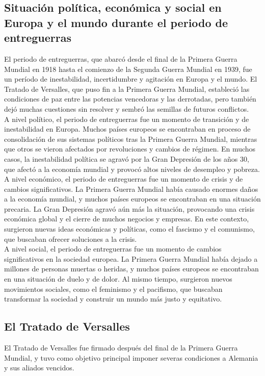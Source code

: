 \documentclass{article}
\theoremstyle{mytheoremstyle}
\theoremstyle{mytheoremstyle}
\theoremstyle{myproblemstyle}
\begin{document}
    \subsection{Situación política, económica y social en Europa y el mundo durante el periodo de entreguerras}
    El periodo de entreguerras, que abarcó desde el final de la Primera Guerra Mundial en 1918 hasta el comienzo de la Segunda Guerra Mundial en 1939, fue un período de inestabilidad, incertidumbre y agitación en Europa y el mundo. El Tratado de Versalles, que puso fin a la Primera Guerra Mundial, estableció las condiciones de paz entre las potencias vencedoras y las derrotadas, pero también dejó muchas cuestiones sin resolver y sembró las semillas de futuros conflictos.\\

    A nivel político, el periodo de entreguerras fue un momento de transición y de inestabilidad en Europa. Muchos países europeos se encontraban en proceso de consolidación de sus sistemas políticos tras la Primera Guerra Mundial, mientras que otros se vieron afectados por revoluciones y cambios de régimen. En muchos casos, la inestabilidad política se agravó por la Gran Depresión de los años 30, que afectó a la economía mundial y provocó altos niveles de desempleo y pobreza.\\

    A nivel económico, el periodo de entreguerras fue un momento de crisis y de cambios significativos. La Primera Guerra Mundial había causado enormes daños a la economía mundial, y muchos países europeos se encontraban en una situación precaria. La Gran Depresión agravó aún más la situación, provocando una crisis económica global y el cierre de muchos negocios y empresas. En este contexto, surgieron nuevas ideas económicas y políticas, como el fascismo y el comunismo, que buscaban ofrecer soluciones a la crisis.\\

    A nivel social, el periodo de entreguerras fue un momento de cambios significativos en la sociedad europea. La Primera Guerra Mundial había dejado a millones de personas muertas o heridas, y muchos países europeos se encontraban en una situación de duelo y de dolor. Al mismo tiempo, surgieron nuevos movimientos sociales, como el feminismo y el pacifismo, que buscaban transformar la sociedad y construir un mundo más justo y equitativo.\\

    \subsection{El Tratado de Versalles}
    El Tratado de Versalles fue firmado después del final de la Primera Guerra Mundial, y tuvo como objetivo principal imponer severas condiciones a Alemania y sus aliados vencidos.\\
\end{document}

